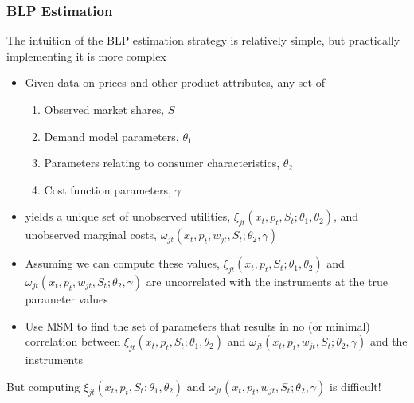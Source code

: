 \documentclass{beamer}
\begin{document}
\begin{frame}\frametitle{BLP Estimation}
    The intuition of the BLP estimation strategy is relatively simple, but practically implementing it is more complex
    \begin{itemize}
        \item Given data on prices and other product attributes, any set of
        \begin{enumerate}
            \item Observed market shares, $S$
            \item Demand model parameters, $\theta_1$
            \item Parameters relating to consumer characteristics, $\theta_2$
            \item Cost function parameters, $\gamma$
        \end{enumerate}
        \item[] yields a unique set of unobserved utilities, $\xi_{jt}(x_t, p_t, S_t; \theta_1, \theta_2)$, and unobserved marginal costs, $\omega_{jt}(x_t, p_t, w_{jt}, S_t; \theta_2, \gamma)$
        \item Assuming we can compute these values, $\xi_{jt}(x_t, p_t, S_t; \theta_1, \theta_2)$ and $\omega_{jt}(x_t, p_t, w_{jt}, S_t; \theta_2, \gamma)$ are uncorrelated with the instruments at the true parameter values
        \item Use MSM to find the set of parameters that results in no (or minimal) correlation between $\xi_{jt}(x_t, p_t, S_t; \theta_1, \theta_2)$ and $\omega_{jt}(x_t, p_t, w_{jt}, S_t; \theta_2, \gamma)$ and the instruments
    \end{itemize}
    \vspace{1ex}
    But computing $\xi_{jt}(x_t, p_t, S_t; \theta_1, \theta_2)$ and $\omega_{jt}(x_t, p_t, w_{jt}, S_t; \theta_2, \gamma)$ is difficult!
\end{frame}
\end{document}

